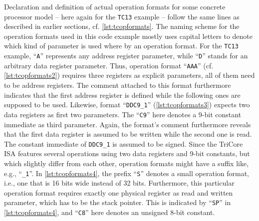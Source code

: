 Declaration and definition of actual operation formats for some concrete processor model -- here again for the \texttt{TC13} example -- follow the same lines as described in earlier sections, cf. \cref{lst:tcopformats}.
The naming scheme for the operation formats used in this code example mostly uses capital letters to denote which kind of parameter is used where by an operation format.
For the \texttt{TC13} example, ``\texttt{A}'' represents any address register parameter, while ``\texttt{D}'' stands for an arbitrary data register parameter.
Thus, operation format ``\texttt{AAA}'' (cf. \cref{lst:tcopformats2}) requires three registers as explicit parameters, all of them need to be address registers.
The comment attached to this format furthermore indicates that the first address register is defined while the following ones are supposed to be used.
Likewise, format ``\texttt{DDC9\_1}'' (\cref{lst:tcopformats3}) expects two data registers as first two parameters.
The ``\texttt{C9}'' here denotes a 9-bit constant immediate as third parameter.
Again, the format's comment furthermore reveals that the first data register is assumed to be written while the second one is read.
The constant immediate of \texttt{DDC9\_1} is assumed to be signed.
Since the TriCore \gls{ISA} features several operations using two data registers and 9-bit constants, but which slightly differ from each other, operation formats might have a suffix like, e.g., ``\texttt{\_1}''.
In \cref{lst:tcopformats4}, the prefix ``\texttt{S}'' denotes a small operation format, i.e., one that is 16 bits wide instead of 32 bits.
Furthermore, this particular operation format requires exactly one physical register as read and written parameter, which has to be the stack pointer.
This is indicated by ``\texttt{SP}'' in \cref{lst:tcopformats4}, and ``\texttt{C8}'' here denotes an unsigned 8-bit constant.

